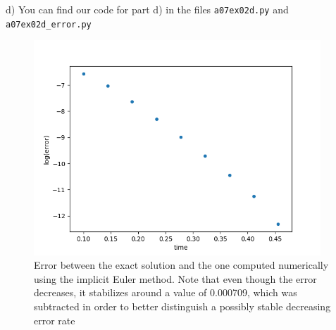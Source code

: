 d)
You can find our code for part d) in the files \texttt{a07ex02d.py} and \texttt{a07ex02d\_error.py}
\begin{figure}[h]
	\includegraphics[width=0.96\textwidth]{error_d.png} 
	\caption{Error between the exact solution and the one computed numerically using the implicit Euler method. Note that even though the error decreases, it stabilizes around a value of 0.000709, which was subtracted in order to better distinguish a possibly stable decreasing error rate }
\end{figure}
